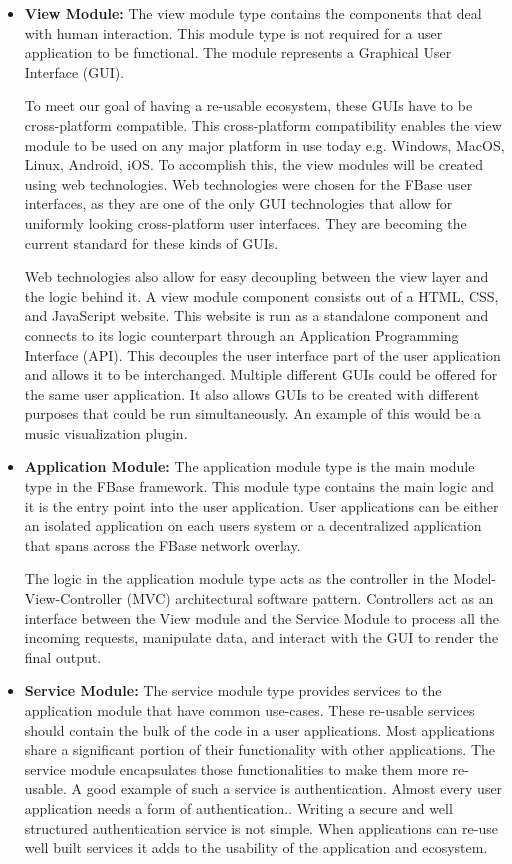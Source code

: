 \begin{itemize}
	\item \textbf{View Module:}
	The view module type contains the components that deal with human interaction. This module type is not required for a user application to be functional. The module represents a Graphical User Interface (GUI). 
	
	To meet our goal of having a re-usable ecosystem, these GUIs have to be cross-platform compatible. This cross-platform compatibility enables the view module to be used on any major platform in use today e.g. Windows, MacOS, Linux, Android, iOS. To accomplish this, the view modules will be created using web technologies. Web technologies were chosen for the FBase user interfaces, as they are one of the only GUI technologies that allow for uniformly looking cross-platform user interfaces. They are becoming the current standard for these kinds of GUIs.
	
	Web technologies also allow for easy decoupling between the view layer and the logic behind it. A view module component consists out of a HTML, CSS, and JavaScript website. This website is run as a standalone component and connects to its logic counterpart through an Application Programming Interface (API). This decouples the user interface part of the user application and allows it to be interchanged. Multiple different GUIs could be offered for the same user application. It also allows GUIs to be created with different purposes that could be run simultaneously. An example of this would be a music visualization plugin.
	
	\item \textbf{Application Module:}
	The application module type is the main module type in the FBase framework. This module type contains the main logic and it is the entry point into the user application. User applications can be either an isolated application on each users system or a decentralized application that spans across the FBase network overlay.
	
	The logic in the application module type acts as the controller in the Model-View-Controller (MVC) architectural software pattern. Controllers act as an interface between the View module and the Service Module to process all the incoming requests, manipulate data, and interact with the GUI to render the final output.
	
	\item \textbf{Service Module:}
	The service module type provides services to the application module that have common use-cases. These re-usable services should contain the bulk of the code in a user applications. Most applications share a significant portion of their functionality with other applications. The service module encapsulates those functionalities to make them more re-usable. A good example of such a service is authentication. Almost every user application needs a form of authentication.. Writing a secure and well structured authentication service is not simple. When applications can re-use well built services it adds to the usability of the application and ecosystem.
	

\end{itemize}
